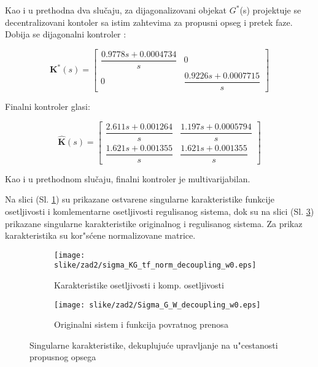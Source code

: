 \documentclass[a4paper,11pt]{article}
\theoremstyle{definition} \newtheorem{deff}{Definicija}[section]
\theoremstyle{definition} \newtheorem{prim}[deff]{Primer}
\theoremstyle{plain} \newtheorem{teor}[deff]{Teorema}
\begin{document}
	\vspace{2cm}
	Kao i u prethodna dva slučaju, za dijagonalizovani objekat $G^*$(s) projektuje se decentralizovani kontoler sa istim zahtevima za propusni opseg i pretek faze. Dobija se dijagonalni kontroler :
	
	\begin{equation}
		\textbf{K}^*(s) = \begin{bmatrix} 
			\dfrac{0.9778s + 0.0004734}{s} & 0 \\
			0 & \dfrac{0.9226s + 0.0007715}{s}
		\end{bmatrix}
	\end{equation}
	
	\vspace{1cm}
	\noindent Finalni kontroler glasi: 
	
	\begin{equation}
		\hat{\textbf{K}}(s) = \begin{bmatrix}  
			\dfrac{2.611s + 0.001264}{s} & \dfrac{1.197s + 0.0005794}{s} \\  
			\dfrac{1.621s + 0.001355}{s} & \dfrac{1.621s + 0.001355}{s} 
		\end{bmatrix}
	\end{equation}
	
	\vspace{1cm}
	\noindent Kao i u prethodnom slučaju, finalni kontroler je multivarijabilan. 
	
	\newpage
	
	Na slici (Sl. \ref{fig:sigmaDEKw0}) su prikazane ostvarene singularne karakteristike funkcije osetljivosti i komlementarne osetljivosti regulisanog sistema, dok su na slici (Sl. \ref{fig:sigmaG_W_dekw0}) prikazane singularne karakteristike originalnog i regulisanog sistema. Za prikaz karakteristika su kor"s\'cene normalizovane matrice.
	
	\hspace{2cm}
	
	\begin{figure}[h]
		\centering
		\begin{subfigure}{0.6\linewidth}
			\centering
			\texttt{[image: slike/zad2/sigma\_KG\_tf\_norm\_decoupling\_w0.eps]}
			\caption{Karakteristike osetljivosti i komp. osetljivosti}
			\label{fig:sigmaDEKw0}
		\end{subfigure}
		\hfill
		\begin{subfigure}{0.6\linewidth}
			\centering
			\texttt{[image: slike/zad2/Sigma\_G\_W\_decoupling\_w0.eps]}
			\caption{Originalni sistem i funkcija povratnog prenosa}
			\label{fig:sigmaG_W_dekw0}
		\end{subfigure}
		\caption{Singularne karakteristike, dekupluju\'ce upravljanje na u"cestanosti propusnog opsega}
	\end{figure}
	
\end{document}
